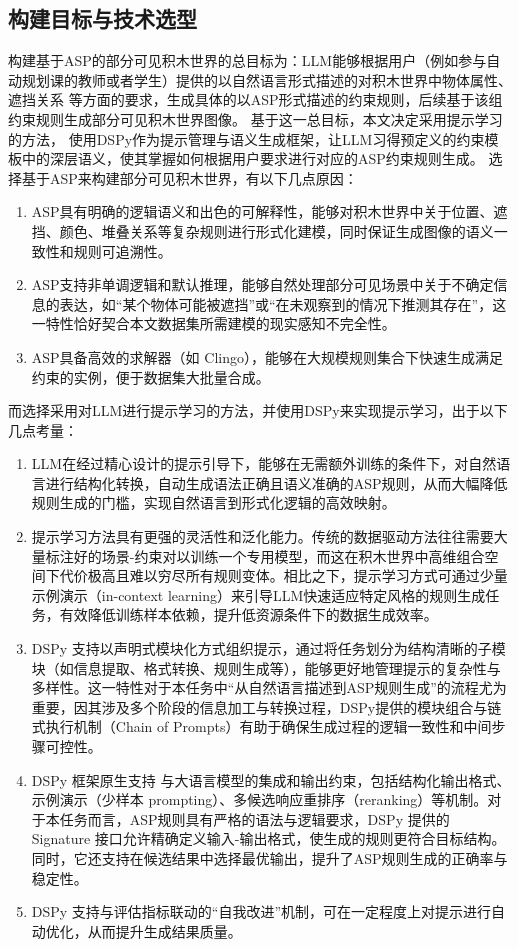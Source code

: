 \subsection{构建目标与技术选型}
构建基于ASP的部分可见积木世界的总目标为：LLM能够根据用户（例如参与自动规划课的教师或者学生）提供的以自然语言形式描述的对积木世界中物体属性、遮挡关系
等方面的要求，生成具体的以ASP形式描述的约束规则，后续基于该组约束规则生成部分可见积木世界图像。
基于这一总目标，本文决定采用提示学习的方法，
使用DSPy作为提示管理与语义生成框架，让LLM习得预定义的约束模板中的深层语义，使其掌握如何根据用户要求进行对应的ASP约束规则生成。
选择基于ASP来构建部分可见积木世界，有以下几点原因：
\begin{enumerate}[nosep]
\item ASP具有明确的逻辑语义和出色的可解释性，能够对积木世界中关于位置、遮挡、颜色、堆叠关系等复杂规则进行形式化建模，同时保证生成图像的语义一致性和规则可追溯性。
\item ASP支持非单调逻辑和默认推理，能够自然处理部分可见场景中关于不确定信息的表达，如“某个物体可能被遮挡”或“在未观察到的情况下推测其存在”，这一特性恰好契合本文数据集所需建模的现实感知不完全性。
\item ASP具备高效的求解器（如 Clingo），能够在大规模规则集合下快速生成满足约束的实例，便于数据集大批量合成。
\end{enumerate}
而选择采用对LLM进行提示学习的方法，并使用DSPy来实现提示学习，出于以下几点考量：
\begin{enumerate}[nosep]
\item LLM在经过精心设计的提示引导下，能够在无需额外训练的条件下，对自然语言进行结构化转换，自动生成语法正确且语义准确的ASP规则，从而大幅降低规则生成的门槛，实现自然语言到形式化逻辑的高效映射。
\item 提示学习方法具有更强的灵活性和泛化能力。传统的数据驱动方法往往需要大量标注好的场景-约束对以训练一个专用模型，而这在积木世界中高维组合空间下代价极高且难以穷尽所有规则变体。相比之下，提示学习方式可通过少量示例演示（in-context learning）来引导LLM快速适应特定风格的规则生成任务，有效降低训练样本依赖，提升低资源条件下的数据生成效率。
\item DSPy 支持以声明式模块化方式组织提示，通过将任务划分为结构清晰的子模块（如信息提取、格式转换、规则生成等），能够更好地管理提示的复杂性与多样性。这一特性对于本任务中“从自然语言描述到ASP规则生成”的流程尤为重要，因其涉及多个阶段的信息加工与转换过程，DSPy提供的模块组合与链式执行机制（Chain of Prompts）有助于确保生成过程的逻辑一致性和中间步骤可控性。
\item DSPy 框架原生支持 与大语言模型的集成和输出约束，包括结构化输出格式、示例演示（少样本 prompting）、多候选响应重排序（reranking）等机制。对于本任务而言，ASP规则具有严格的语法与逻辑要求，DSPy 提供的 Signature 接口允许精确定义输入-输出格式，使生成的规则更符合目标结构。同时，它还支持在候选结果中选择最优输出，提升了ASP规则生成的正确率与稳定性。
\item DSPy 支持与评估指标联动的“自我改进”机制，可在一定程度上对提示进行自动优化，从而提升生成结果质量。
\end{enumerate}

